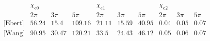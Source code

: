 $$
\begin{array}{c|ccc|ccc|ccc}
 \text{} & \chi _{\text{c0}} &  &  & \chi _{\text{c1}} &  &  & \chi _{\text{c2}} &  &  \\
 \text{} & \text{2$\pi $} & \text{3$\pi $} & \text{5$\pi $} & \text{2$\pi $} & \text{3$\pi $} & \text{5$\pi $} & \text{2$\pi $} & \text{3$\pi $} & \text{5$\pi $} \\
\hline
 \text{[Ebert]} & 56.24 & 15.4 & 109.16 & 21.11 & 15.59 & 40.95 & 0.04 & 0.05 & 0.07 \\
 \text{[Wang]} & 90.95 & 30.47 & 120.21 & 33.5 & 24.43 & 46.12 & 0.05 & 0.06 & 0.07 \\
\end{array}$$
